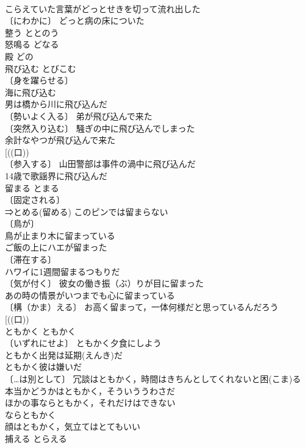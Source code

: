 \documentclass[8pt]{extreport}
\begin{document}
\begin{CJK}{UTF8}{min}
\\	こらえていた言葉がどっとせきを切って流れ出した 
\\	〔にわかに〕 どっと病の床についた 
\\	整う	ととのう	
\\	怒鳴る	どなる	
\\	殿	どの	
\\	飛び込む	とびこむ	
\\	〔身を躍らせる〕
\\	海に飛び込む 
\\	男は橋から川に飛び込んだ 
\\	〔勢いよく入る〕 弟が飛び込んで来た 
\\	〔突然入り込む〕 騒ぎの中に飛び込んでしまった 
\\	余計なやつが飛び込んで来た 
\\	[((口)) 
\\	〔参入する〕 山田警部は事件の渦中に飛び込んだ 
\\	14歳で歌謡界に飛び込んだ 
\\	留まる	とまる	
\\	〔固定される〕
\\	⇒とめる(留める) このピンでは留まらない 
\\	〔鳥が〕
\\	鳥が止まり木に留まっている 
\\	ご飯の上にハエが留まった 
\\	〔滞在する〕
\\	ハワイに1週間留まるつもりだ 
\\	〔気が付く〕 彼女の働き振（ぶ）りが目に留まった 
\\	あの時の情景がいつまでも心に留まっている 
\\	〔構（かま）える〕 お高く留まって，一体何様だと思っているんだろう 
\\	[((口)) 
\\	ともかく	ともかく	
\\	〔いずれにせよ〕 ともかく夕食にしよう 
\\	ともかく出発は延期(えんき)だ 
\\	ともかく彼は嫌いだ 
\\	〔…は別として〕 冗談はともかく，時間はきちんとしてくれないと困(こま)る 
\\	本当かどうかはともかく，そういううわさだ 
\\	ほかの事ならともかく，それだけはできない 
\\	ならともかく　
\\	顔はともかく，気立てはとてもいい 
\\	捕える	とらえる	

\end{CJK}
\end{document}
